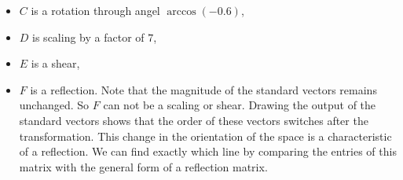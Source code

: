 \begin{SaveQuestion}
\begin{itemize}
        \item $C$ is a rotation through angel $\arccos(-0.6)$, 
        \item $D$ is scaling by a factor of $7$, 
        \item $E$ is a shear,
        \item $F$ is a reflection. Note that the magnitude of the standard vectors remains unchanged. So $F$ can not be a scaling or shear. Drawing the output of the standard vectors shows that the order of these vectors switches after the transformation. This change in the orientation of the space is a characteristic of a reflection. We can find exactly which line by comparing the entries of this matrix with the general form of a reflection matrix. 
    \end{itemize}
\end{SaveQuestion}


